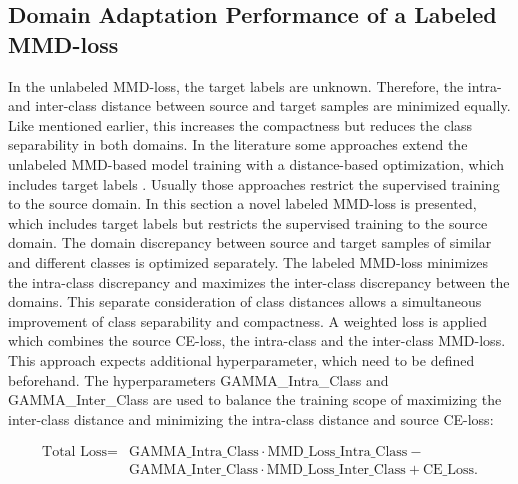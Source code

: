 \subsection{Domain Adaptation Performance of a Labeled MMD-loss} \label{sec:Differences of labeled and unlabeled MMD loss}

In the unlabeled MMD-loss, the target labels are unknown. Therefore, the intra- and inter-class distance between source and target samples are minimized equally. Like mentioned earlier, this increases the compactness but reduces the class separability in both domains. In the literature some approaches extend the unlabeled MMD-based model training with a distance-based optimization, which includes target labels \cite{Pandhare2021}. Usually those approaches restrict the supervised training to the source domain. In this section a novel labeled MMD-loss is presented, which includes target labels but restricts the supervised training to the source domain. The domain discrepancy between source and target samples of similar and different classes is optimized separately. The labeled MMD-loss minimizes the intra-class discrepancy and maximizes the inter-class discrepancy between the domains. This separate consideration of class distances allows a simultaneous improvement of class separability and compactness. A weighted loss is applied which combines the source CE-loss, the intra-class and the inter-class MMD-loss. This approach expects additional hyperparameter, which need to be defined beforehand. The hyperparameters GAMMA\_Intra\_Class and GAMMA\_Inter\_Class are used to balance the training scope of maximizing the inter-class distance and minimizing the intra-class distance and source CE-loss:

\begin{equation}
\begin{split}
    \mbox{Total Loss} = & \mbox{GAMMA\_Intra\_Class}  \cdot \mbox{MMD\_Loss\_Intra\_Class} - \\
                              &\mbox{GAMMA\_Inter\_Class} \cdot \mbox{MMD\_Loss\_Inter\_Class} + \mbox{CE\_Loss}.
\end{split}
\end{equation}

